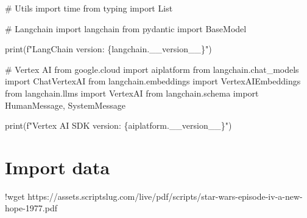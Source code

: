 \documentclass[
  letterpaper,
  DIV=11,
  numbers=noendperiod]{scrreprt}
\newenvironment{Shaded}{\begin{snugshade}}{\end{snugshade}}
\newcommand{\BuiltInTok}[1]{\textcolor[rgb]{0.00,0.23,0.31}{#1}}
\newcommand{\CommentTok}[1]{\textcolor[rgb]{0.37,0.37,0.37}{#1}}
\newcommand{\ErrorTok}[1]{\textcolor[rgb]{0.68,0.00,0.00}{#1}}
\newcommand{\FloatTok}[1]{\textcolor[rgb]{0.68,0.00,0.00}{#1}}
\newcommand{\ImportTok}[1]{\textcolor[rgb]{0.00,0.46,0.62}{#1}}
\newcommand{\NormalTok}[1]{\textcolor[rgb]{0.00,0.23,0.31}{#1}}
\newcommand{\OperatorTok}[1]{\textcolor[rgb]{0.37,0.37,0.37}{#1}}
\newcommand{\SpecialCharTok}[1]{\textcolor[rgb]{0.37,0.37,0.37}{#1}}
\newcommand{\SpecialStringTok}[1]{\textcolor[rgb]{0.13,0.47,0.30}{#1}}
\begin{document}
\begin{Shaded}
\begin{Highlighting}[]
\CommentTok{\# Utils}
\ImportTok{import}\NormalTok{ time}
\ImportTok{from}\NormalTok{ typing }\ImportTok{import}\NormalTok{ List}

\CommentTok{\# Langchain}
\ImportTok{import}\NormalTok{ langchain}
\ImportTok{from}\NormalTok{ pydantic }\ImportTok{import}\NormalTok{ BaseModel}

\BuiltInTok{print}\NormalTok{(}\SpecialStringTok{f"LangChain version: }\SpecialCharTok{\{}\NormalTok{langchain}\SpecialCharTok{.}\NormalTok{\_\_version\_\_}\SpecialCharTok{\}}\SpecialStringTok{"}\NormalTok{)}

\CommentTok{\# Vertex AI}
\ImportTok{from}\NormalTok{ google.cloud }\ImportTok{import}\NormalTok{ aiplatform}
\ImportTok{from}\NormalTok{ langchain.chat\_models }\ImportTok{import}\NormalTok{ ChatVertexAI}
\ImportTok{from}\NormalTok{ langchain.embeddings }\ImportTok{import}\NormalTok{ VertexAIEmbeddings}
\ImportTok{from}\NormalTok{ langchain.llms }\ImportTok{import}\NormalTok{ VertexAI}
\ImportTok{from}\NormalTok{ langchain.schema }\ImportTok{import}\NormalTok{ HumanMessage, SystemMessage}

\BuiltInTok{print}\NormalTok{(}\SpecialStringTok{f"Vertex AI SDK version: }\SpecialCharTok{\{}\NormalTok{aiplatform}\SpecialCharTok{.}\NormalTok{\_\_version\_\_}\SpecialCharTok{\}}\SpecialStringTok{"}\NormalTok{)}
\end{Highlighting}
\end{Shaded}

\hypertarget{import-data-1}{%
\chapter{Import data}\label{import-data-1}}

\begin{Shaded}
\begin{Highlighting}[]
\OperatorTok{!}\NormalTok{wget https:}\OperatorTok{//}\NormalTok{assets.scriptslug.com}\OperatorTok{/}\NormalTok{live}\OperatorTok{/}\NormalTok{pdf}\OperatorTok{/}\NormalTok{scripts}\OperatorTok{/}\NormalTok{star}\OperatorTok{{-}}\NormalTok{wars}\OperatorTok{{-}}\NormalTok{episode}\OperatorTok{{-}}\NormalTok{iv}\OperatorTok{{-}}\NormalTok{a}\OperatorTok{{-}}\NormalTok{new}\OperatorTok{{-}}\NormalTok{hope}\OperatorTok{{-}}\FloatTok{1977.}\ErrorTok{pdf}
\end{Highlighting}
\end{Shaded}
\end{document}
